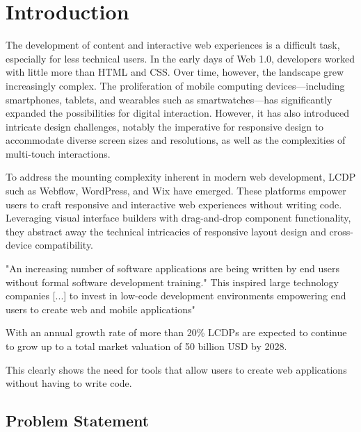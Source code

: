 \documentclass[oneside,12pt]{book}
\let\oldmainmatter\mainmatter
\renewcommand{\mainmatter}{
  \oldmainmatter
  \pagestyle{mainmatter}
}
\begin{document}
\newpage
\listoftables

\newpage
\lstlistoflistings

\mainmatter

\chapter{Introduction}
\label{ch:introduction}

The development of content and interactive web experiences is a difficult task, especially for less technical users. In the early days of Web 1.0, developers worked with little more than HTML and CSS. Over time, however, the landscape grew increasingly complex. The proliferation of mobile computing devices—including smartphones, tablets, and wearables such as smartwatches—has significantly expanded the possibilities for digital interaction. However, it has also introduced intricate design challenges, notably the imperative for responsive design to accommodate diverse screen sizes and resolutions, as well as the complexities of multi-touch interactions.\cite{kim2021designpatternstradeoffsresponsive}

To address the mounting complexity inherent in modern web development, \gls{LCDP} such as Webflow, WordPress, and Wix have emerged. These platforms empower users to craft responsive and interactive web experiences without writing code. Leveraging visual interface builders with drag-and-drop component functionality, they abstract away the technical intricacies of responsive layout design and cross-device compatibility.

"An increasing number of software applications are being written by end users without formal 
software development training."\cite{kuhail2021characterizing} 
This inspired large technology companies [...] to invest in low-code development environments 
empowering end users to create web and mobile applications"\cite{kuhail2021characterizing}

With an annual growth rate of more than 20\% \gls{LCDP}s are expected to continue to grow up to a total market valuation of 50 billion USD by 2028.\cite{bratincevic2024lowcode}

This clearly shows the need for tools that allow users to create web applications without having to write code.


\section{Problem Statement}
\label{sec:visual-builder-overview}
\end{document}
